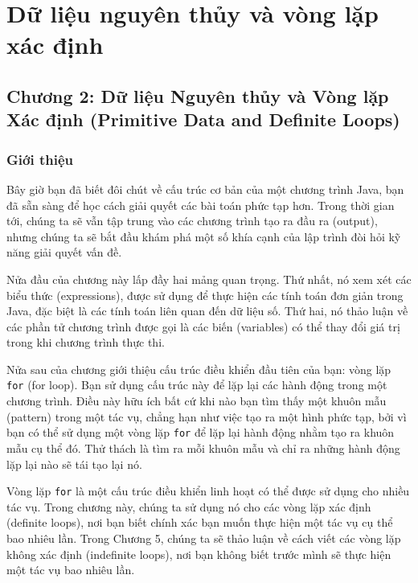 
\providecommand{\pandocbounded}[1]{#1}
\makeatletter
\def\maxwidth{\ifdim\Gin@nat@width>\linewidth\linewidth\else\Gin@nat@width\fi}
\def\maxheight{\ifdim\Gin@nat@height>\textheight\textheight\else\Gin@nat@height\fi}
\makeatother
\providecommand{\tightlist}{\setlength{\itemsep}{0pt}\setlength{\parskip}{0pt}}
\chapter{Dữ liệu nguyên thủy và vòng lặp xác định}
\section{Chương 2: Dữ liệu Nguyên thủy và Vòng lặp Xác định (Primitive
Data and Definite
Loops)}\label{chux1b0ux1a1ng-2-dux1eef-liux1ec7u-nguyuxean-thux1ee7y-vuxe0-vuxf2ng-lux1eb7p-xuxe1c-ux111ux1ecbnh-primitive-data-and-definite-loops}

\subsection{Giới thiệu}\label{giux1edbi-thiux1ec7u}

Bây giờ bạn đã biết đôi chút về cấu trúc cơ bản của một chương trình
Java, bạn đã sẵn sàng để học cách giải quyết các bài toán phức tạp hơn.
Trong thời gian tới, chúng ta sẽ vẫn tập trung vào các chương trình tạo
ra đầu ra (output), nhưng chúng ta sẽ bắt đầu khám phá một số khía cạnh
của lập trình đòi hỏi kỹ năng giải quyết vấn đề.

Nửa đầu của chương này lấp đầy hai mảng quan trọng. Thứ nhất, nó xem xét
các biểu thức (expressions), được sử dụng để thực hiện các tính toán đơn
giản trong Java, đặc biệt là các tính toán liên quan đến dữ liệu số. Thứ
hai, nó thảo luận về các phần tử chương trình được gọi là các biến
(variables) có thể thay đổi giá trị trong khi chương trình thực thi.

Nửa sau của chương giới thiệu cấu trúc điều khiển đầu tiên của bạn: vòng
lặp \texttt{for} (for loop). Bạn sử dụng cấu trúc này để lặp lại các
hành động trong một chương trình. Điều này hữu ích bất cứ khi nào bạn
tìm thấy một khuôn mẫu (pattern) trong một tác vụ, chẳng hạn như việc
tạo ra một hình phức tạp, bởi vì bạn có thể sử dụng một vòng lặp
\texttt{for} để lặp lại hành động nhằm tạo ra khuôn mẫu cụ thể đó. Thử
thách là tìm ra mỗi khuôn mẫu và chỉ ra những hành động lặp lại nào sẽ
tái tạo lại nó.

Vòng lặp \texttt{for} là một cấu trúc điều khiển linh hoạt có thể được
sử dụng cho nhiều tác vụ. Trong chương này, chúng ta sử dụng nó cho các
vòng lặp xác định (definite loops), nơi bạn biết chính xác bạn muốn thực
hiện một tác vụ cụ thể bao nhiêu lần. Trong Chương 5, chúng ta sẽ thảo
luận về cách viết các vòng lặp không xác định (indefinite loops), nơi
bạn không biết trước mình sẽ thực hiện một tác vụ bao nhiêu lần.

